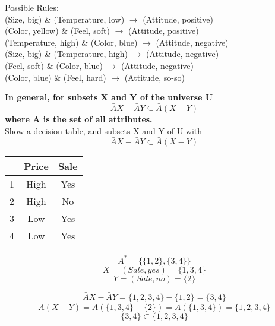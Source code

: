\documentclass[10pt]{amsart}
\begin{document}
Possible Rules:\\
(Size, big) \& (Temperature, low) $\rightarrow$ (Attitude, positive) \\
(Color, yellow) \& (Feel, soft) $\rightarrow$ (Attitude, positive) \\
(Temperature, high) \& (Color, blue) $\rightarrow$ (Attitude, negative) \\
(Size, big) \& (Temperature, high) $\rightarrow$ (Attitude, negative)\\
(Feel, soft) \& (Color, blue) $\rightarrow$ (Attitude, negative)\\
(Color, blue) \& (Feel, hard) $\rightarrow$ (Attitude, so-so)\\

\begin{center}
\textbf{In general, for subsets X and Y of the universe U}
$$\bar{A}X-\bar{A}Y \subseteq \bar{A}(X-Y)$$
\textbf{where A is the set of all attributes.}\\
Show a decision table, and subsets X and Y of U with\\
$$\bar{A}X-\bar{A}Y \subset \bar{A}(X-Y)$$

\begin{tabular}{c|c|c|}
  & Price & Sale \\
\hline
1 & High & Yes\\
2 & High & No\\
3 & Low & Yes\\
4 & Low & Yes\\
\hline
\end{tabular}

$$A^* = \{\{1,2\},\{3,4\}\}$$
$$X=(Sale, yes)=\{1,3,4\}$$
$$Y=(Sale, no)=\{2\}$$

$$\bar{A}X-\bar{A}Y = \{1,2,3,4\} - \{1,2\} = \{3,4\}$$
$$\bar{A}(X-Y) = \bar{A}( \{1,3,4\} - \{2\} ) = \bar{A}(\{1,3,4\}) = \{1,2,3,4\}$$
$$\{3,4\} \subset \{1,2,3,4\}$$
\end{center}
\end{document}
